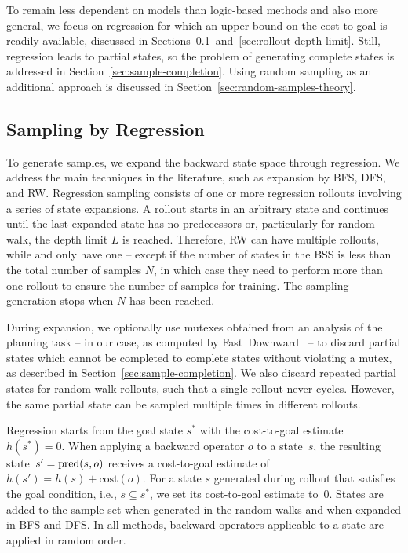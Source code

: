 To remain less dependent on models than logic-based methods and also more general, we focus on regression for which an upper bound on the cost-to-goal is readily available, discussed in Sections~\ref{sec:sampling-generation}~and~\ref{sec:rollout-depth-limit}. Still, regression leads to partial states, so the problem of generating complete states is addressed in Section~\ref{sec:sample-completion}. Using random sampling as an additional approach is discussed in Section~\ref{sec:random-samples-theory}.

\subsection{Sampling by Regression}
\label{sec:sampling-generation}

To generate samples, we expand the backward state space through regression. We address the main techniques in the literature, such as expansion by BFS, DFS, and RW. Regression sampling consists of one or more regression rollouts involving a series of state expansions. A rollout starts in an arbitrary state and continues until the last expanded state has no predecessors or, particularly for random walk, the depth limit $L$ is reached. Therefore, RW can have multiple rollouts, while \bfs and \dfs only have one -- except if the number of states in the BSS is less than the total number of samples $N$, in which case they need to perform more than one rollout to ensure the number of samples for training. The sampling generation stops when $N$ has been reached.

During expansion, we optionally use mutexes obtained from an analysis of the planning task -- in our case, as computed by Fast~Downward~\cite{Helmert/2006} -- to discard partial states which cannot be completed to complete states without violating a mutex, as described in Section~\ref{sec:sample-completion}. We also discard repeated partial states for random walk rollouts, such that a single rollout never cycles. However, the same partial state can be sampled multiple times in different rollouts.

Regression starts from the goal state $s^*$ with the cost-to-goal estimate~$h(s^*)=0$. When applying a backward operator $o$ to a state~$s$, the resulting state~$s' = \operatorname{pred}(s, o)$ receives a cost-to-goal estimate of $h(s') = h(s) + \text{cost}(o)$. For a state $s$ generated during rollout that satisfies the goal condition, i.e., $s \subseteq s^*$, we set its cost-to-goal estimate to~$0$. States are added to the sample set when generated in the random walks and when expanded in BFS and DFS. In all methods, backward operators applicable to a state are applied in random order.

